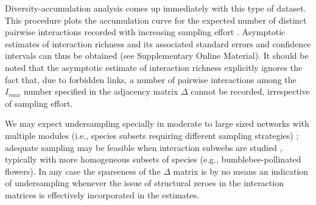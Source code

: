 \documentclass[12pt]{article}
\begin{document}
Diversity-accumulation analysis \citep{Magurran:1988mm,Hortal:2006dc} comes up immediately with this type of dataset. This procedure plots the accumulation curve for the expected number of distinct pairwise interactions recorded with increasing sampling effort \citep{Jordano:2009c,Olesen:2011a}. Asymptotic estimates of interaction richness and its associated standard errors and confidence intervals can thus be obtained \citep{Hortal:2006dc} (see Supplementary Online Material). It should be noted that the asymptotic estimate of interaction richness explicitly ignores the fact that, due to forbidden links, a number of pairwise interactions among the $I_{max}$ number specified in the adjacency matrix $\Delta$ cannot be recorded, irrespective of sampling effort. 

We may expect undersampling specially in moderate to large sized networks with multiple modules (i.e., species subsets requiring different sampling strategies) \citep{E31/2562,Olesen:2011a,Chacoff:2012}; adequate sampling may be feasible when interaction subwebs are studied \citep{Olesen:2011a,Vizentin-Bugoni:2014hc}, typically with more homogeneous subsets of species (e.g., bumblebee-pollinated flowers). In any case the sparseness of the $\Delta$ matrix is by no means an indication of undersampling whenever the issue of structural zeroes in the interaction matrices is effectively incorporated in the estimates. 
\end{document}
